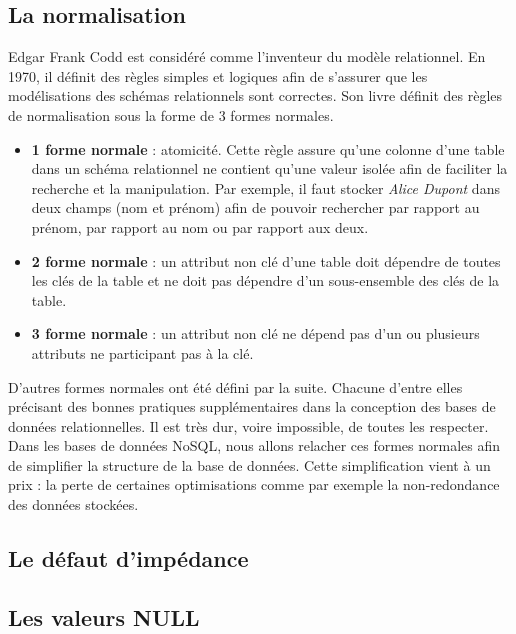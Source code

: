 \subsection{La normalisation}

    Edgar Frank Codd est considéré comme l'inventeur du modèle relationnel. En 1970, il définit des règles simples et logiques afin de s'assurer que les modélisations des schémas relationnels sont correctes\cite{Wikipedia_Edgar_Frank_Codd}. Son livre définit des règles de normalisation sous la forme de 3 formes normales.
    \vspace{10px}
    \begin{itemize}
      \item \textbf{1\iere{} forme normale} : atomicité. Cette règle assure qu'une colonne d'une table dans un schéma relationnel ne contient qu'une valeur isolée afin de faciliter la recherche et la manipulation. Par exemple, il faut stocker \textit{Alice Dupont} dans deux champs (nom et prénom) afin de pouvoir rechercher par rapport au prénom, par rapport au nom ou par rapport aux deux.
      \item \textbf{2\ieme{} forme normale} : un attribut non clé d'une table doit dépendre de toutes les clés de la table et ne doit pas dépendre d'un sous-ensemble des clés de la table.
      \item \textbf{3\ieme{} forme normale} : un attribut non clé ne dépend pas d'un ou plusieurs attributs ne participant pas à la clé.
    \end{itemize}
    \vspace{20px}
    D'autres formes normales ont été défini par la suite. Chacune d'entre elles précisant des bonnes pratiques supplémentaires dans la conception des bases de données relationnelles. Il est très dur, voire impossible, de toutes les respecter. Dans les bases de données NoSQL, nous allons relacher ces formes normales afin de simplifier la structure de la base de données. Cette simplification vient à un prix : la perte de certaines optimisations comme par exemple la non-redondance des données stockées.

\subsection{Le défaut d'impédance}
\subsection{Les valeurs NULL}
